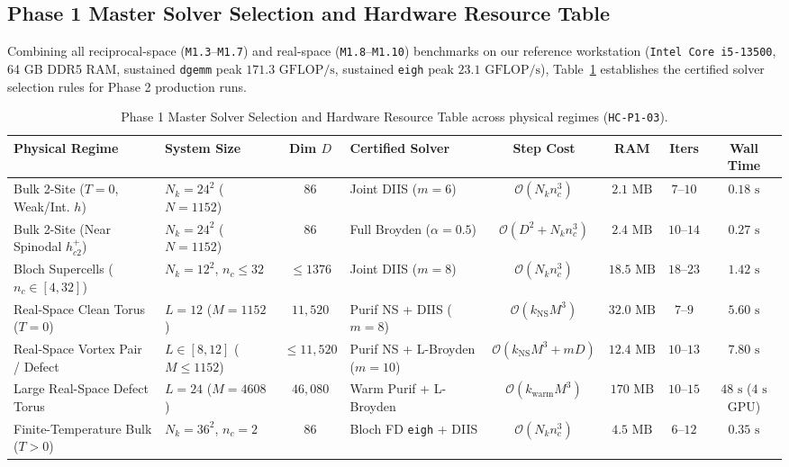 \subsection{Phase 1 Master Solver Selection and Hardware Resource Table}
Combining all reciprocal-space (\texttt{M1.3}--\texttt{M1.7}) and real-space (\texttt{M1.8}--\texttt{M1.10}) benchmarks on our reference workstation (\texttt{Intel Core i5-13500}, 64 GB DDR5 RAM, sustained \texttt{dgemm} peak $171.3\text{ GFLOP/s}$, sustained \texttt{eigh} peak $23.1\text{ GFLOP/s}$), Table~\ref{tab:m1_9_master_solver_selection} establishes the certified solver selection rules for Phase 2 production runs.

\begin{table}[htbp]
\centering
\footnotesize
\caption{Phase 1 Master Solver Selection and Hardware Resource Table across physical regimes (\texttt{HC-P1-03}).}
\label{tab:m1_9_master_solver_selection}
\begin{tabular}{llclcccc}
\toprule
\textbf{Physical Regime} & \textbf{System Size} & \textbf{Dim $D$} & \textbf{Certified Solver} & \textbf{Step Cost} & \textbf{RAM} & \textbf{Iters} & \textbf{Wall Time} \\
\midrule
Bulk 2-Site ($T=0$, Weak/Int. $h$) & $N_k = 24^2$ ($N=1152$) & $86$ & Joint DIIS ($m=6$) & $\mathcal{O}(N_k n_c^3)$ & $2.1\text{ MB}$ & $7\text{--}10$ & $0.18\text{ s}$ \\
Bulk 2-Site (Near Spinodal $h_{c2}^+$) & $N_k = 24^2$ ($N=1152$) & $86$ & Full Broyden ($\alpha=0.5$) & $\mathcal{O}(D^2 + N_k n_c^3)$ & $2.4\text{ MB}$ & $10\text{--}14$ & $0.27\text{ s}$ \\
Bloch Supercells ($n_c \in [4, 32]$) & $N_k = 12^2$, $n_c \le 32$ & $\le 1376$ & Joint DIIS ($m=8$) & $\mathcal{O}(N_k n_c^3)$ & $18.5\text{ MB}$ & $18\text{--}23$ & $1.42\text{ s}$ \\
Real-Space Clean Torus ($T=0$) & $L=12$ ($M=1152$) & $11{,}520$ & Purif NS + DIIS ($m=8$) & $\mathcal{O}(k_{\mathrm{NS}} M^3)$ & $32.0\text{ MB}$ & $7\text{--}9$ & $5.60\text{ s}$ \\
Real-Space Vortex Pair / Defect & $L \in [8, 12]$ ($M \le 1152$) & $\le 11{,}520$ & Purif NS + L-Broyden ($m=10$) & $\mathcal{O}(k_{\mathrm{NS}} M^3 + mD)$ & $12.4\text{ MB}$ & $10\text{--}13$ & $7.80\text{ s}$ \\
Large Real-Space Defect Torus & $L=24$ ($M=4608$) & $46{,}080$ & Warm Purif + L-Broyden & $\mathcal{O}(k_{\mathrm{warm}} M^3)$ & $170\text{ MB}$ & $10\text{--}15$ & $48\text{ s}$ ($4\text{ s}$ GPU) \\
Finite-Temperature Bulk ($T > 0$) & $N_k = 36^2$, $n_c=2$ & $86$ & Bloch FD \texttt{eigh} + DIIS & $\mathcal{O}(N_k n_c^3)$ & $4.5\text{ MB}$ & $6\text{--}12$ & $0.35\text{ s}$ \\
\bottomrule
\end{tabular}
\end{table}

